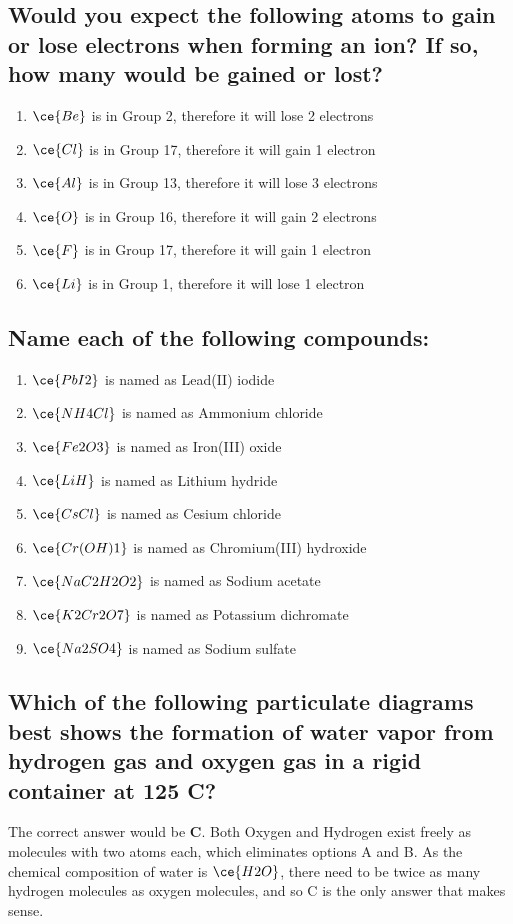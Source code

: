 \documentclass{scrartcl}
\begin{document}
\subsection{Would you expect the following atoms to gain or lose electrons when forming an ion? If so, how many would be gained or lost?}
\label{sec:orgdbd42c0}
\begin{enumerate}
\item \(\ce{Be}\) is in Group 2, therefore it will lose 2 electrons
\item \(\ce{Cl}\) is in Group 17, therefore it will gain 1 electron
\item \(\ce{Al}\) is in Group 13, therefore it will lose 3 electrons
\item \(\ce{O}\) is in Group 16, therefore it will gain 2 electrons
\item \(\ce{F}\) is in Group 17, therefore it will gain 1 electron
\item \(\ce{Li}\) is in Group 1, therefore it will lose 1 electron
\end{enumerate}

\subsection{Name each of the following compounds:}
\label{sec:org92f962d}
\begin{enumerate}
\item \(\ce{PbI2}\) is named as Lead(II) iodide
\item \(\ce{NH4Cl}\) is named as Ammonium chloride
\item \(\ce{Fe2O3}\) is named as Iron(III) oxide
\item \(\ce{LiH}\) is named as Lithium hydride
\item \(\ce{CsCl}\) is named as Cesium chloride
\item \(\ce{Cr(OH)1}\) is named as Chromium(III) hydroxide
\item \(\ce{NaC2H2O2}\) is named as Sodium acetate
\item \(\ce{K2Cr2O7}\) is named as Potassium dichromate
\item \(\ce{Na2SO4}\) is named as Sodium sulfate
\end{enumerate}

\subsection{Which of the following particulate diagrams best shows the formation of water vapor from hydrogen gas and oxygen gas in a rigid container at 125\textdegree{} C?}
\label{sec:org5290575}
The correct answer would be \textbf{C}. Both Oxygen and Hydrogen exist freely as molecules with two atoms each, which eliminates options A and B. As the chemical composition of water is \(\ce{H2O}\), there need to be twice as many hydrogen molecules as oxygen molecules, and so C is the only answer that makes sense.
\end{document}
